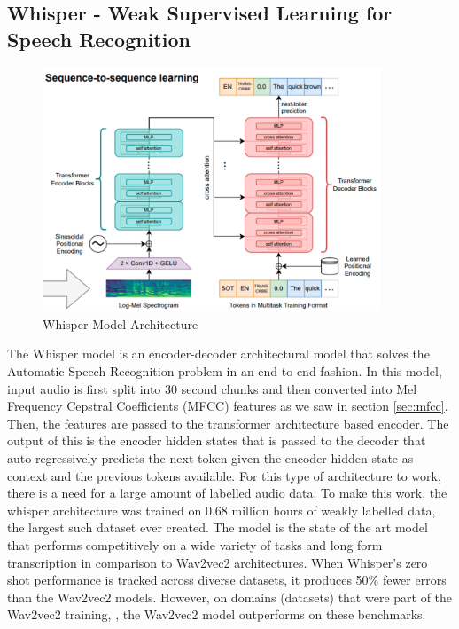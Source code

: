 \subsection{Whisper - Weak Supervised Learning for Speech Recognition}%
\label{sec:whisper}

\begin{figure} [H]
    \centering
    \includegraphics[width=0.9\textwidth]{03-Theoretical Foundations/figures/whisper.pdf}
    \caption{Whisper Model Architecture}
    \label{fig:whisper}
\end{figure}


The Whisper model is an encoder-decoder architectural model that solves the Automatic Speech Recognition problem in an end to end fashion. In this model, input audio is first split into 30 second chunks and then converted into Mel Frequency Cepstral Coefficients (MFCC) features as we saw in section \ref{sec:mfcc}. Then, the features are passed to the transformer architecture based encoder. The output of this is the encoder hidden states that is passed to the decoder that auto-regressively predicts the next token given the encoder hidden state as context and the previous tokens available. For this type of architecture to work, there is a need for a large amount of labelled audio data. To make this work, the whisper architecture was trained on 0.68 million hours of weakly labelled data, the largest such dataset ever created. The model is the state of the art model that performs competitively on a wide variety of tasks and long form transcription in comparison to Wav2vec2 architectures. When Whisper's zero shot performance is tracked across diverse datasets, it produces 50\% fewer errors than the Wav2vec2 models. However, on domains (datasets) that were part of the Wav2vec2 training, , the Wav2vec2 model outperforms on these benchmarks.

